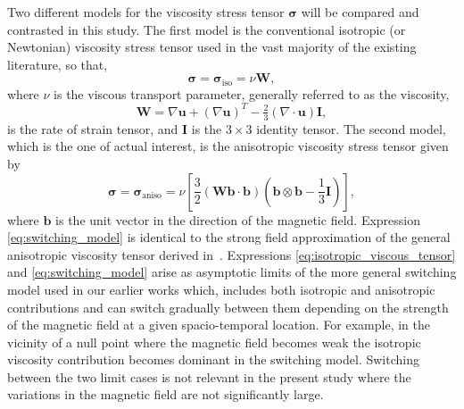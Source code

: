 \documentclass[fleqn,usenatbib]{mnras}
\newcommand{\rs}[2]{{#2}}
\newcommand{\ten}[1]{{\bm #1}}
\renewcommand{\vec}[1]{{\bm #1}}
\begin{document}
\rs{}{Two different models for the viscosity stress tensor $\ten{\sigma}$
will be compared and contrasted in this study. The first model is the
conventional} isotropic (or Newtonian) viscosity stress tensor \rs{}{used in
the vast majority of the existing literature, so that,} 
\begin{equation}
  \label{eq:isotropic_viscous_tensor}
\rs{}{\ten{\sigma} = }\ten{\sigma}_{\rs{{iso}}{\text{iso}}} = \nu \ten{W},
\end{equation}
where $\nu$ is the viscous transport parameter, generally referred to as the viscosity,
\begin{equation}
  \label{eq:rate_of_strain}
  \ten{W} = \nabla\vec{u} + (\nabla\vec{u})^T - \tfrac{2}{3}(\nabla \cdot \vec{u})\ten{I},
\end{equation}
is the rate of strain tensor, and $\ten{I}$ is the  $3\times 3$
identity \rs{}{tensor. The second model, which is the one of actual interest, is the} anisotropic viscosity stress
tensor given by
\begin{equation}
  \label{eq:switching_model}
\rs{}{\ten{\sigma} = \ten{\sigma}_\text{aniso}} = \nu \left[\frac{3}{2}(\ten{W}\vec{b}\cdot\vec{b}) \left( \vec{b} \otimes \vec{b} - \frac{1}{3}\ten{I} \right)\right],
\end{equation}
where $\vec{b}$ is the unit vector in the direction of the magnetic
field.
\rs{}{
Expression \eqref{eq:switching_model} is identical to the strong field approximation of the
general anisotropic viscosity tensor derived in~\citet{braginskiiTransportProcessesPlasma1965}.
Expressions \eqref{eq:isotropic_viscous_tensor} and \eqref{eq:switching_model} arise as asymptotic limits of the
more general switching model used in our earlier works 
\citep{mactaggartBraginskiiMagnetohydrodynamicsArbitrary2017,quinnEffectAnisotropicViscosity2020,quinnKelvinHelmholtzInstabilityCollapse2021}
which, includes both isotropic and anisotropic contributions and can
switch gradually between them depending on the strength of the
magnetic field at a given spacio-temporal location. For example, in
the vicinity of a null point where the magnetic field becomes weak the
isotropic viscosity contribution becomes dominant in the switching
model. Switching between the two limit cases is not relevant in the
present study where the variations in the magnetic field are not
significantly large.}
\end{document}
